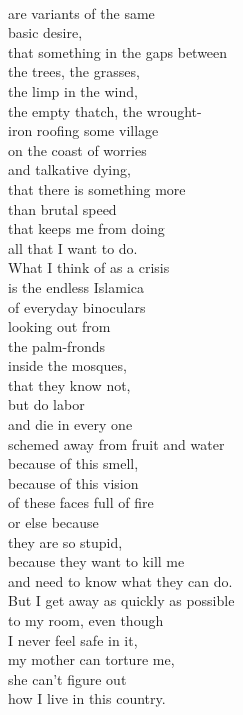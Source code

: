 \documentclass[smalldemyvopaper,11pt,twoside,onecolumn,openright,extrafontsizes]{memoir}
\begin{document}
\\are variants of the same
\\basic desire,
\\that something in the gaps between
\\the trees, the grasses,
\\the limp in the wind,
\\the empty thatch, the wrought-
\\iron roofing some village
\\on the coast of worries
\\and talkative dying,
\\that there is something more
\\than brutal speed
\\that keeps me from doing
\\all that I want to do.
\\What I think of as a crisis
\\is the endless Islamica
\\of everyday binoculars
\\looking out from
\\the palm-fronds
\\inside the mosques,
\\that they know not,
\\but do labor
\\and die in every one
\\schemed away from fruit and water
\\because of this smell,
\\because of this vision
\\of these faces full of fire
\\or else because
\\they are so stupid,
\\because they want to kill me
\\and need to know what they can do.
\\But I get away as quickly as possible
\\to my room, even though
\\I never feel safe in it,
\\my mother can torture me,
\\she can't figure out
\\how I live in this country.
\end{document}
